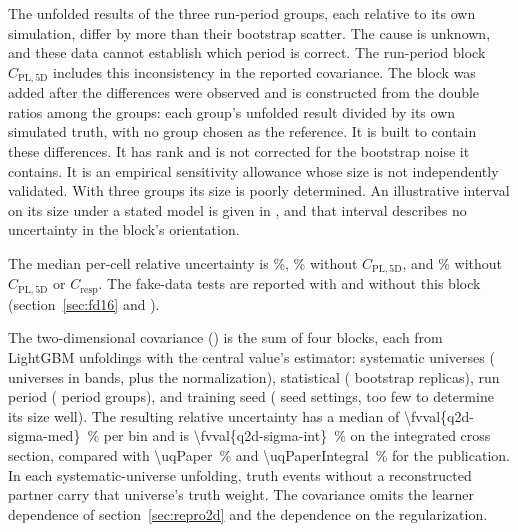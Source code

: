 The unfolded results of the three run-period groups, each relative to its own simulation, differ by more than their bootstrap scatter. The cause is unknown, and these data cannot establish which period is correct. The run-period block $C_{\mathrm{PL,5D}}$ includes this inconsistency in the reported covariance. The block was added after the differences were observed and is constructed from the double ratios among the groups: each group's unfolded result divided by its own simulated truth, with no group chosen as the reference. It is built to contain these differences. It has rank  and is not corrected for the bootstrap noise it contains. It is an empirical sensitivity allowance whose size is not independently validated. With three groups its size is poorly determined. An illustrative interval on its size under a stated model is given in , and that interval describes no uncertainty in the block's orientation.


The median per-cell relative uncertainty is \%, \% without $C_{\mathrm{PL,5D}}$, and \% without $C_{\mathrm{PL,5D}}$ or $C_{\mathrm{resp}}$. The fake-data tests are reported with and without this block (section~\ref{sec:fd16} and ).

The two-dimensional covariance () is the sum of four blocks, each from LightGBM unfoldings with the central value's estimator: systematic universes ( universes in  bands, plus the normalization), statistical ( bootstrap replicas), run period ( period groups), and training seed ( seed settings, too few to determine its size well). The resulting relative uncertainty has a median of \SI{\fvval{q2d-sigma-med}}{\percent} per bin and is \SI{\fvval{q2d-sigma-int}}{\percent} on the integrated cross section, compared with \SI{\uqPaper}{\percent} and \SI{\uqPaperIntegral}{\percent} for the publication. In each systematic-universe unfolding, truth events without a reconstructed partner carry that universe's truth weight. The covariance omits the learner dependence of section~\ref{sec:repro2d} and the dependence on the regularization.

